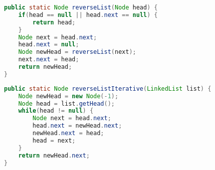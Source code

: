 
\begin{lstlisting}[language=Java]
public static Node reverseList(Node head) {
    if(head == null || head.next == null) {
        return head;
    }
    Node next = head.next;
    head.next = null;
    Node newHead = reverseList(next);
    next.next = head;
    return newHead;
}
\end{lstlisting}

\vspace{0.5cm}


\begin{lstlisting}[language=Java]
public static Node reverseListIterative(LinkedList list) {
    Node newHead = new Node(-1);
    Node head = list.getHead();
    while(head != null) {
        Node next = head.next;
        head.next = newHead.next;
        newHead.next = head;
        head = next;
    }
    return newHead.next;
}
\end{lstlisting}

\newpage
